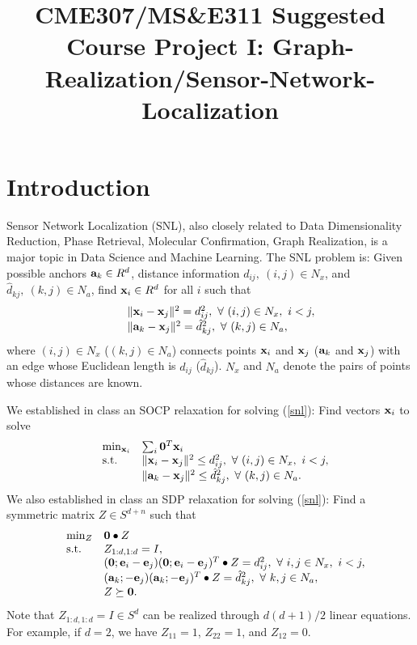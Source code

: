 \documentclass[10pt]{article}
\newcommand\x{{\bf x}}
\newcommand\e{{\bf e}}
\newcommand\bz{{\bf 0}}
\renewcommand\a{{\bf a}}
\begin{document}
\title{CME307/MS\&E311 Suggested Course Project I: Graph-Realization/Sensor-Network-Localization}
\maketitle

\section{Introduction}
Sensor Network Localization (SNL), also closely related to Data Dimensionality Reduction, Phase Retrieval, Molecular Confirmation, Graph Realization, is a major topic in Data Science and Machine Learning. The SNL problem is: Given possible anchors $\a_k\in R^d$, distance information $d_{ij}, \ (i,j)\in N_x$, and $\hat{d}_{kj}, \ (k,j)\in N_a$, find $\x_i\in R^d$ for all $i$ such that
\begin{equation}\label{snl}
\begin{array}{lll}
&                  & \|\x_i-\x_j\|^2 = d_{ij}^2,\ \forall\ (i,j)\in N_x,\ i<j,\\
&                  & \|\a_k-\x_j\|^2 = \hat{d}_{kj}^2,\ \forall\ (k,j)\in N_a,
\end{array}
\end{equation}
where $(i,j)\in N_x$ ($(k,j)\in N_a$) connects points $\x_i$ and $\x_j$ ($\a_k$ and $\x_j$) with an edge
whose Euclidean length is $d_{ij}$ ($\hat{d}_{kj}$). $N_x$ and $N_a$ denote the pairs of points whose distances are known.

We established in class an SOCP relaxation for solving (\ref{snl}): Find vectors $\x_i$ to solve
\begin{equation}\label{snl-socp}
\begin{array}{lll}
&\min_{\x_i}        &    \sum_{i}\bz^T\x_i\\
&\mbox{s.t.} &  \|\x_i-\x_j\|^2\le d_{ij}^2,\ \forall\ (i,j)\in N_x,\ i<j,\\
&                  & \|\a_k-\x_j\|^2\le \hat{d}_{kj}^2,\ \forall\ (k,j)\in N_a.
\end{array}
\end{equation}
We also established in class an SDP relaxation for solving (\ref{snl}): Find a symmetric matrix $Z\in S^{d+n}$ such that
\begin{equation}\label{snl-sdp}
\begin{array}{lll}
&\min_Z        & \bz\bullet Z\\
&\mbox{s.t.} & Z_{1:d,1:d}=I,\\
&             & (\bz;\e_i-\e_j)(\bz;\e_i-\e_j)^T\bullet Z=d_{ij}^2,\ \forall\ i,j\in N_x,\ i<j,\\
&             & (\a_k;-\e_{j}) (\a_k;-\e_{j})^T\bullet Z = \hat{d}_{kj}^2,\ \forall\ k,j\in N_a,\\
&             & Z\succeq \bz.
\end{array}
\end{equation}
Note that $Z_{1:d,1:d}=I\in S^d$ can be realized through $d(d+1)/2$ linear equations. For example, if $d=2$, we have
$Z_{11}=1$, $Z_{22}=1$, and $Z_{12}=0$.
\end{document}

